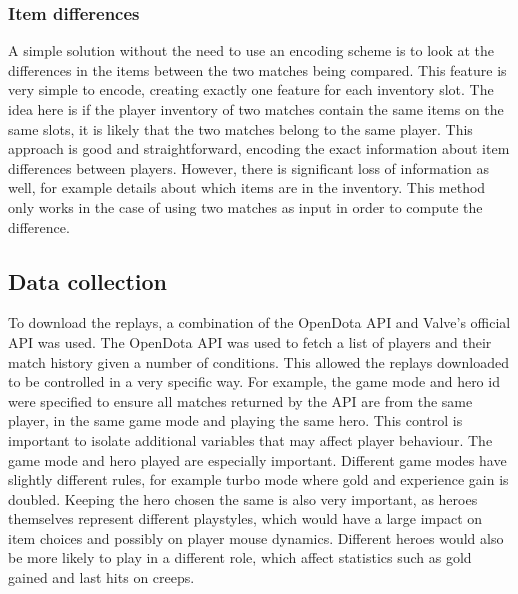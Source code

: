 \documentclass[Report.tex]{subfiles}
\begin{document}
\subsubsection{Item differences}
A simple solution without the need to use an encoding scheme is to look at the differences in the items between the two matches being compared. This feature is very simple to encode, creating exactly one feature for each inventory slot. The idea here is if the player inventory of two matches contain the same items on the same slots, it is likely that the two matches belong to the same player. This approach is good and straightforward, encoding the exact information about item differences between players. However, there is significant loss of information as well, for example details about which items are in the inventory. This method only works in the case of using two matches as input in order to compute the difference.

\subsection{Data collection}\label{sec:data-collection}
To download the replays, a combination of the OpenDota \cite{opendota} API and Valve's official API was used. The OpenDota API was used to fetch a list of players and their match history given a number of conditions. This allowed the replays downloaded to be controlled in a very specific way. For example, the game mode and hero id were specified to ensure all matches returned by the API are from the same player, in the same game mode and playing the same hero. This control is important to isolate additional variables that may affect player behaviour. The game mode and hero played are especially important. Different game modes have slightly different rules, for example turbo mode where gold and experience gain is doubled. Keeping the hero chosen the same is also very important, as heroes themselves represent different playstyles, which would have a large impact on item choices and possibly on player mouse dynamics. Different heroes would also be more likely to play in a different role, which affect statistics such as gold gained and last hits on creeps. 
\end{document}
